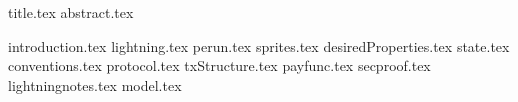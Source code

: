 \documentclass[11pt]{llncs}
\begin{document}
{title.tex}
\thispagestyle{plain}
{abstract.tex}

{introduction.tex}
{lightning.tex}
{perun.tex}
{sprites.tex}
{desiredProperties.tex}
{state.tex}
{conventions.tex}
{protocol.tex}
{txStructure.tex}
{payfunc.tex}
{secproof.tex}
{lightningnotes.tex}
{model.tex}

\end{document}
